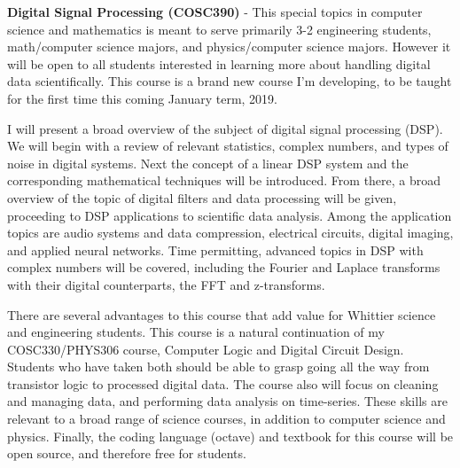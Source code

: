 \documentclass[../../main.tex]{subfiles}
\begin{document}
\textbf{Digital Signal Processing (COSC390)} - This special topics in computer science and mathematics is meant to serve primarily 3-2 engineering students, math/computer science majors, and physics/computer science majors.  However it will be open to all students interested in learning more about handling digital data scientifically.  This course is a brand new course I'm developing, to be taught for the first time this coming January term, 2019. \\ \hspace{0.1cm}

I will present a broad overview of the subject of digital signal processing (DSP).  We will begin with a review of relevant statistics, complex numbers, and types of noise in digital systems. Next the concept of a linear DSP system and the corresponding mathematical techniques will be introduced. From there, a broad overview of the topic of digital filters and data processing will be given, proceeding to DSP applications to scientific data analysis. Among the application topics are audio systems and data compression, electrical circuits, digital imaging, and applied neural networks. Time permitting, advanced topics in DSP with complex numbers will be covered, including the Fourier and Laplace transforms with their digital counterparts, the FFT and z-transforms. \\ \hspace{0.1cm}

There are several advantages to this course that add value for Whittier science and engineering students.  This course is a natural continuation of my COSC330/PHYS306 course, Computer Logic and Digital Circuit Design.  Students who have taken both should be able to grasp going all the way from transistor logic to processed digital data.  The course also will focus on cleaning and managing data, and performing data analysis on time-series.  These skills are relevant to a broad range of science courses, in addition to computer science and physics.  Finally, the coding language (octave) and textbook for this course will be open source, and therefore free for students. \\ \hspace{0.1cm}
\end{document}
